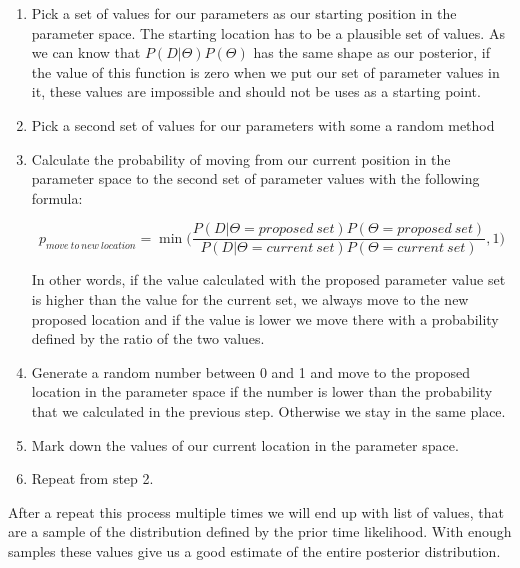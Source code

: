 \documentclass[12pt,a4paper,leqno]{report}
\theoremstyle{plain}
\theoremstyle{definition}
\theoremstyle{remark}
\begin{document}
\begin{enumerate}
    \item Pick a set of values for our parameters as our starting position in
          the parameter space. The starting location has to be a plausible set
          of values. As we can know that
          \(P(D|\Theta)P(\Theta)\) has the same shape as our posterior, if
          the value of this function is zero when we put our set of
          parameter values in it, these values are impossible and should not be
          uses as a starting point.
    \item Pick a second set of values for our parameters with some a random method
    \item Calculate the probability of moving from our current position in the
          parameter space to the second set of parameter values with the
          following formula:

          \begin{def}\label{randomwalk}
              \begin{equation}
                  p_{move\ to\ new\ location} = \min \bigg(\frac{P(D|\Theta = proposed\ set)P(\Theta = proposed\ set)}{P(D|\Theta = current\ set)P(\Theta = current\ set)}, 1 \bigg)
              \end{equation}
          \end{def}

          In other words, if the value calculated with the proposed parameter
          value set is higher than the value for the current set, we always move
          to the new proposed location and if the value
          is lower we move there with a probability defined by the ratio of the
          two values.
    \item Generate a random number between 0 and 1 and move to the proposed
          location in the parameter space if the number is lower than the
          probability that we calculated in the previous step. Otherwise we stay
          in the same place.
    \item Mark down the values of our current location in the parameter space.
    \item Repeat from step 2.

\end{enumerate}

After a repeat this process multiple times we will end up with list of values,
that are a sample of the distribution defined by the prior time
likelihood. With enough samples these values give us a good estimate of the entire
posterior distribution.
\end{document}
